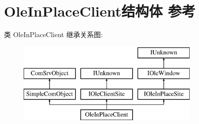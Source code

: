 \hypertarget{struct_ole_in_place_client}{}\section{Ole\+In\+Place\+Client结构体 参考}
\label{struct_ole_in_place_client}
类 Ole\+In\+Place\+Client 继承关系图\+:\begin{figure}[H]
\begin{center}
\leavevmode
\includegraphics[height=4.000000cm]{struct_ole_in_place_client}
\end{center}
\end{figure}
